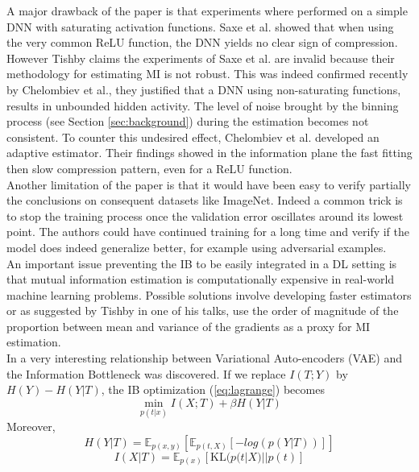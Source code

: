 \documentclass[twocolumn,superscriptaddress,aps]{revtex4-1}
\begin{document}
A major drawback of the paper is that experiments where performed on a simple DNN with saturating activation functions. Saxe et al.\citep{saxe} showed that when using the very common ReLU function, the DNN yields no clear sign of compression. However Tishby claims the experiments of Saxe et al.\citep{saxe} are invalid because their methodology for estimating MI is not robust. This was indeed confirmed recently by Chelombiev et al.\cite{MI1}, they justified that a DNN using non-saturating functions, results in unbounded hidden activity. The level of noise brought by the binning process (see Section \ref{sec:background}) during the estimation becomes not consistent. To counter this undesired effect, Chelombiev et al.\cite{MI1} developed an adaptive estimator. Their findings showed in the information plane the fast fitting then slow compression pattern, even for a ReLU function.\\
\indent Another limitation of the paper is that it would have been easy to verify partially the conclusions on consequent datasets like ImageNet\cite{imagenet}. Indeed a common trick is to stop the training process once the validation error oscillates around its lowest point. The authors could have continued training for a long time and verify if the model does indeed generalize better, for example using adversarial examples.\\
\indent An important issue preventing the IB to be easily integrated in a DL setting is that mutual information estimation is computationally expensive in real-world machine learning problems. Possible solutions involve developing faster estimators \citep{MI1, MI2} or as suggested by Tishby in one of his talks, use the order of magnitude of the proportion between mean and variance of the gradients as a proxy for MI estimation. \\
\indent In \citep{vib} a very interesting relationship between Variational Auto-encoders (VAE) \citep{Kingma} and the Information Bottleneck was discovered. If we replace $I(T;Y)$ by $ H(Y)-H(Y|T)$, the IB optimization (\ref{eq:lagrange}) becomes 
\begin{equation}
\min_{p(t|x)} I(X;T) + \beta H(Y|T)
\label{eq:new-lagrange}
\end{equation}
Moreover,
\begin{equation}
H(Y|T) = \mathbb{E}_{p(x,y)} \left[\mathbb{E}_{p(t,X)}\left[-log(p(Y|T))\right]\right]
\end{equation}\vspace*{-0.1mm}
\begin{equation}
I(X|T) = \mathbb{E}_{p(x)} \left[\text{KL}(p(t|X) || p(t) \right]
\end{equation}
\end{document}
